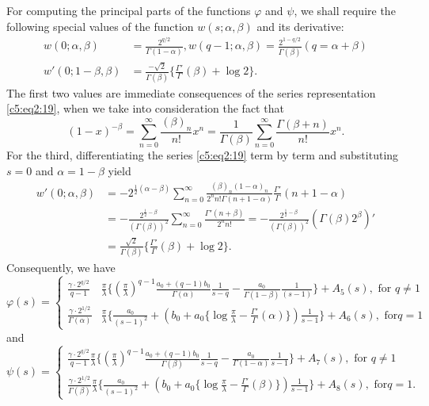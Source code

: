 For computing the principal parts of the functions $\varphi$ and
$\psi$, we shall require the following special values of the function
$w(s;\alpha,\beta)$ and its derivative:
\begin{align*}
w(0;\alpha,\beta) & =\frac{2^{q/2}}{\Gamma(1-\alpha)},
w(q-1;\alpha,\beta) =\frac{2^{1-q/2}}{\Gamma(\beta)}
(q=\alpha+\beta)\\
w' (0;1-\beta,\beta) & = \frac{-\surd 2}{\Gamma(\beta)}
\{\frac{\Gamma'}{\Gamma} (\beta) + \log 2\}. 
\end{align*}
The first two values are immediate consequences of the series
representation \eqref{c5:eq2:19}, when we take into 
consideration the fact that
$$
(1-x)^{-\beta} = \sum^{\infty}_{n=0} \frac{(\beta)_n}{n!} x^n =
\frac{1}{\Gamma(\beta)} \sum^{\infty}_{n=0} 
\frac{\Gamma(\beta+n)}{n!}
x^n. 
$$
For the third, differentiating the series \eqref{c5:eq2:19} term by term and
substituting $s=0$ and $\alpha=1-\beta$ yield
\begin{align*}
w'(0;\alpha,\beta) & = -2^{\frac{1}{2}(\alpha-\beta)}
\sum^{\infty}_{n=0} \frac{(\beta)_n (1-\alpha)_n}{2^n n!
  \Gamma(n+1-\alpha)} \frac{\Gamma'}{\Gamma} (n+1-\alpha)\\
& = -\frac{2^{\frac{1}{2}-\beta}}{(\Gamma(\beta))^2}
\sum^{\infty}_{n=0} \frac{\Gamma'(n+\beta)}{2^n n!} = -
\frac{2^{\frac{1}{2}-\beta}}{(\Gamma (\beta))^2}
(\Gamma(\beta)2^{\beta})'\\
& = \frac{\surd 2}{\Gamma(\beta)} \{\frac{\Gamma'}{\Gamma} (\beta) +
\log 2\}. 
\end{align*}
Consequently, \pageoriginale we have
{\fontsize{10}{12}\selectfont
\begin{equation*}
\varphi(s) = \begin{cases}
\frac{\gamma\cdot 2^{q/2}}{q-1} & \frac{\pi}{\lambda}
\{(\frac{\pi}{\lambda})^{q-1} \frac{a_0+(q-1)b_0}{\Gamma(\alpha)}
\frac{1}{s-q} -\frac{a_0}{\Gamma(1-\beta)} \frac{1}{(s-1)}\} + A_5
(s), \text{ for } q \neq 1\\
\frac{\gamma \cdot 2^{1/2}}{\Gamma(\alpha)}& \frac{\pi}{\lambda} \{
\frac{a_0}{(s-1)^2} + (b_0+a_0\{\log \frac{\pi}{\lambda}
-\frac{\Gamma'}{\Gamma}(\alpha)\}) \frac{1}{s-1}\} + A_6(s), \text{ for
} q =1
\end{cases}\tag{23}\label{c5:eq2:23}
\end{equation*}}\relax
and 
{\fontsize{10}{12}\selectfont
\begin{equation*}
\psi(s)= \begin{cases}
\frac{\gamma\cdot 2^{q/2}}{q-1} \frac{\pi}{\lambda}
\{(\frac{\pi}{\lambda})^{q-1}\frac{a_0+(q-1)b_0}{\Gamma(\beta)}
\frac{1}{s-q} -\frac{a_0}{\Gamma(1-\alpha)} \frac{1}{s-1}\} + A_7(s),
\text{ for } q \neq 1\\
\frac{\gamma\cdot 2^{1/2}}{\Gamma(\beta)} \frac{\pi}{\lambda}
\{\frac{a_0}{(s-1)^2} + (b_0 + a_0 \{\log\frac{\pi}{\lambda} -
\frac{\Gamma'}{\Gamma}(\beta)\}) \frac{1}{s-1}\} + A_8 (s), \text{ for
} q=1.\end{cases}\tag{24}\label{c5:eq2:24}
\end{equation*}}\relax
